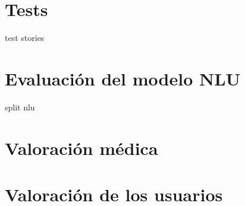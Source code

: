 \section{Tests}
test stories

\section{Evaluación del modelo NLU}
split nlu 

\section{Valoración médica}

\section{Valoración de los usuarios}

